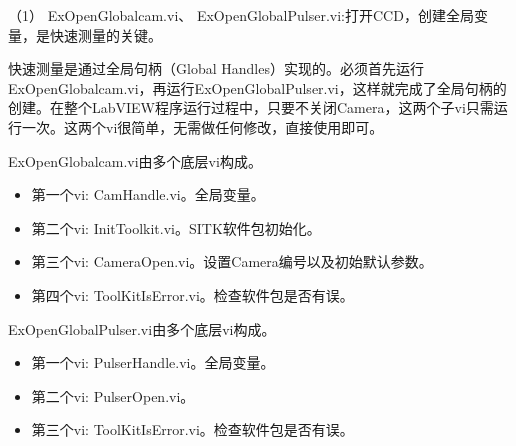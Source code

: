 （1） ExOpenGlobalcam.vi、 ExOpenGlobalPulser.vi:打开CCD，创建全局变量，是快速测量的关键。

快速测量是通过全局句柄（Global Handles）实现的。必须首先运行ExOpenGlobalcam.vi，再运行ExOpenGlobalPulser.vi，这样就完成了全局句柄的创建。在整个LabVIEW程序运行过程中，只要不关闭Camera，这两个子vi只需运行一次。这两个vi很简单，无需做任何修改，直接使用即可。

ExOpenGlobalcam.vi由多个底层vi构成。
\begin{itemize}
\item 第一个vi: CamHandle.vi。全局变量。
\item 第二个vi: InitToolkit.vi。SITK软件包初始化。
\item 第三个vi: CameraOpen.vi。设置Camera编号以及初始默认参数。
\item 第四个vi: ToolKitIsError.vi。检查软件包是否有误。
\end{itemize}

ExOpenGlobalPulser.vi由多个底层vi构成。
\begin{itemize}
\item 第一个vi: PulserHandle.vi。全局变量。
\item 第二个vi: PulserOpen.vi。
\item 第三个vi: ToolKitIsError.vi。检查软件包是否有误。
\end{itemize}


